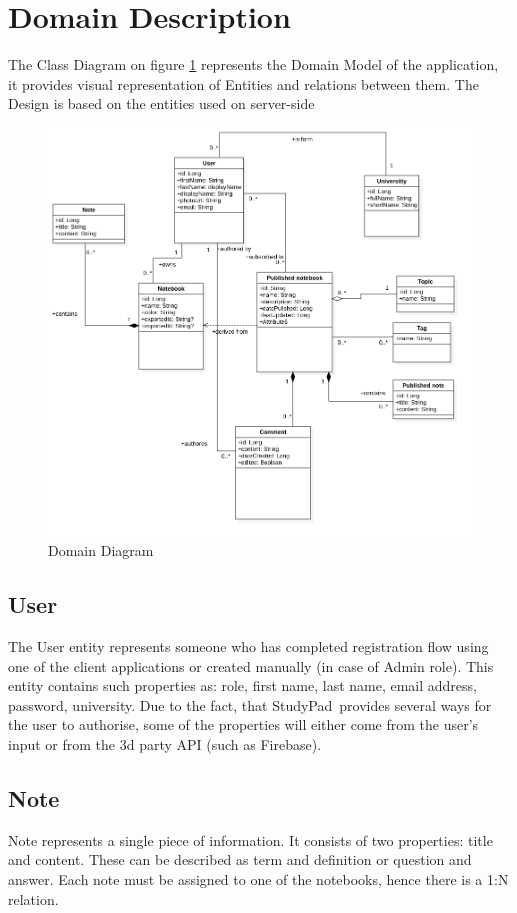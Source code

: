 \documentclass[thesis=B,english]{FITthesis}[2012/10/20]
\newcommand{\appname}{StudyPad}
\begin{document}
\newpage
\section{Domain Description}
 The Class Diagram on figure \ref{fig:domain} represents the Domain Model of the application, it provides visual representation of Entities and relations between them. The Design is based on the entities used on server-side

\begin{figure}[H]
  \includegraphics[width=\linewidth]{Domain}
  \caption{Domain Diagram}
  \label{fig:domain}
\end{figure}

 

\subsection{User}
	The User entity represents someone who has completed registration flow using one of the client applications or created manually (in case of Admin role). This entity contains such properties as: role, first name, last name, email address, password, university. Due to the fact, that \appname\ provides several ways for the user to authorise, some of the properties will either come from the user's input or from the 3d party API (such as Firebase).
	
\subsection{Note}
	Note represents a single piece of information. It consists of two properties: title and content. These can be described as term and definition or question and answer. Each note must be assigned to one of the notebooks, hence there is a 1:N relation.
\end{document}
